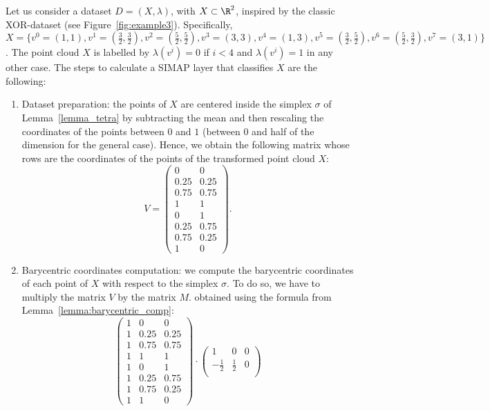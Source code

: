 \begin{example}\label{example:XOR}
Let us consider a dataset 
$D=(X,\lambda)$, with $X\subset\R^2$,
inspired by
the classic XOR-dataset (see Figure~\ref{fig:example3}). Specifically, 
$X
=\big\{v^0=(1,1), v^1=\left(\frac{3}{2},\frac{3}{2}\right),v^2=\left(\frac{5}{2},\frac{5}{2}\right), v^3= (3,3), v^4=(1,3),v^5=\left(\frac{3}{2}, \frac{5}{2}\right),v^6=\left(\frac{5}{2}, \frac{3}{2}\right), v^7=(3,1) \big\}$. The point cloud $X$
is labelled by $\lambda(v^i)=0$ if $i<4$ and $\lambda(v^i)=1$ in any other case. The steps to calculate a SIMAP layer that classifies $X$
are the following:
\begin{enumerate}
    \item Dataset preparation: the points of $X$ are centered inside the simplex $\sigma$ of Lemma~\ref{lemma_tetra} by subtracting the mean and then rescaling the coordinates of the points between $0$ and $1$ (between $0$ and half of the dimension for the general case).
    Hence, we obtain the following matrix whose rows are the coordinates of the points of the transformed
    point cloud $X$:
    $$ V=\begin{pmatrix}
0 & 0 \\
0.25 & 0.25 \\
0.75 & 0.75 \\
1 & 1 \\
0 & 1 \\
0.25 & 0.75 \\
0.75 & 0.25 \\
1 & 0 
\end{pmatrix}.  $$
\item Barycentric coordinates computation: we compute the barycentric coordinates of each point of $X$ with respect to the simplex $\sigma$.
To do so, we have to multiply the matrix $V$ by the matrix $M$. obtained using the formula from Lemma~\ref{lemma:barycentric_comp}:
\[\begin{pmatrix}
1& 0 & 0 \\
1& 0.25 & 0.25 \\
1& 0.75 & 0.75 \\
1& 1 & 1 \\
1& 0 & 1 \\
1& 0.25 & 0.75 \\
1& 0.75 & 0.25 \\
1& 1 & 0 
\end{pmatrix}\cdot  \begin{pmatrix}
1 & 0 & 0 \\
-\frac{1}{2} & \frac{1}{2} & 0 \\

\end{pmatrix}\]
\end{enumerate}
\end{example}
